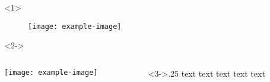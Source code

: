 \documentclass{beamer}
\begin{document}
\begin{frame}

\begin{onlyenv}<1>
    \begin{figure}
        \texttt{[image: example-image]}
    \end{figure}
\end{onlyenv}

\begin{onlyenv}<2->
    \begin{columns}[onlytextwidth]
        \begin{column}{.7\textwidth}
            \centering  
            \texttt{[image: example-image]}
        \end{column}
        \begin{column}<3->{.25\textwidth}
            text text text text text
        \end{column}
    \end{columns}
\end{onlyenv}

\end{frame} 
\end{document}
